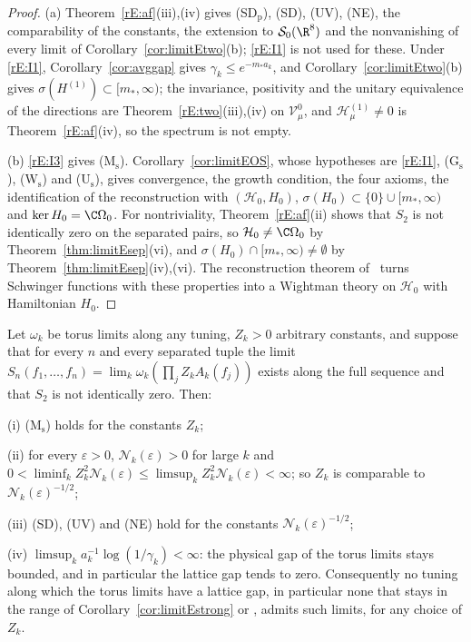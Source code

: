 \begin{proof}
(a) Theorem~\ref{rE:af}(iii),(iv) gives (SD$_{\mathrm p}$), (SD), (UV), (NE),
the comparability of the constants, the extension to $\mathcal S_0(\R^8)$
and the nonvanishing of every limit of Corollary~\ref{cor:limitEtwo}(b);
\ref{rE:I1} is not used for these. Under \ref{rE:I1},
Corollary~\ref{cor:avggap} gives $\gamma_k\le e^{-m_*a_k}$, and
Corollary~\ref{cor:limitEtwo}(b) gives $\sigma(H^{(1)})\subset[m_*,\infty)$;
the invariance, positivity and the unitary equivalence of the directions
are Theorem~\ref{rE:two}(iii),(iv) on $\mathcal V^0_\mu$, and
$\mathcal H^{(1)}_\mu\ne0$ is Theorem~\ref{rE:af}(iv), so the spectrum is
not empty.

(b) \ref{rE:I3} gives (M$_{\mathrm s}$). Corollary~\ref{cor:limitEOS}, whose
hypotheses are \ref{rE:I1}, (G$_{\mathrm s}$), (W$_{\mathrm s}$) and
(U$_{\mathrm s}$), gives convergence, the growth condition, the four axioms,
the identification of the reconstruction with $(\mathcal H_0,H_0)$,
$\sigma(H_0)\subset\{0\}\cup[m_*,\infty)$ and $\ker H_0=\C\Omega_0$. For
nontriviality, Theorem~\ref{rE:af}(ii) shows that $S_2$ is not identically
zero on the separated pairs, so $\mathcal H_0\ne\C\Omega_0$ by
Theorem~\ref{thm:limitEsep}(vi), and $\sigma(H_0)\cap[m_*,\infty)\ne
\emptyset$ by Theorem~\ref{thm:limitEsep}(iv),(vi). The reconstruction
theorem of~\cite{OS75} turns Schwinger functions with these properties into
a Wightman theory on $\mathcal H_0$ with Hamiltonian $H_0$.
\end{proof}

\begin{proposition}\label{rE:necessary}
Let $\omega_k$ be torus limits along any tuning, $Z_k>0$ arbitrary
constants, and suppose that for every $n$ and every separated tuple the
limit $S_n(f_1,\dots,f_n)=\lim_k\omega_k(\prod_jZ_kA_k(f_j))$ exists along
the full sequence and that $S_2$ is not identically zero. Then:

\textup{(i)} \textup{(M$_{\mathrm s}$)} holds for the constants $Z_k$;

\textup{(ii)} for every $\varepsilon>0$, $\mathcal N_k(\varepsilon)>0$ for
large $k$ and $0<\liminf_kZ_k^2\mathcal N_k(\varepsilon)\le\limsup_kZ_k^2
\mathcal N_k(\varepsilon)<\infty$; so $Z_k$ is comparable to
$\mathcal N_k(\varepsilon)^{-1/2}$;

\textup{(iii)} \textup{(SD)}, \textup{(UV)} and \textup{(NE)} hold for the
constants $\mathcal N_k(\varepsilon)^{-1/2}$;

\textup{(iv)} $\limsup_ka_k^{-1}\log(1/\gamma_k)<\infty$: the physical gap of
the torus limits stays bounded, and in particular the lattice gap tends to
zero. Consequently no tuning along which the torus limits have a lattice
gap, in particular none that stays in the range of
Corollary~\textup{\ref{cor:limitEstrong}} or
\textup{\cite[Corollary~322]{BBLR26}}, admits such limits, for any
choice of $Z_k$.
\end{proposition}

